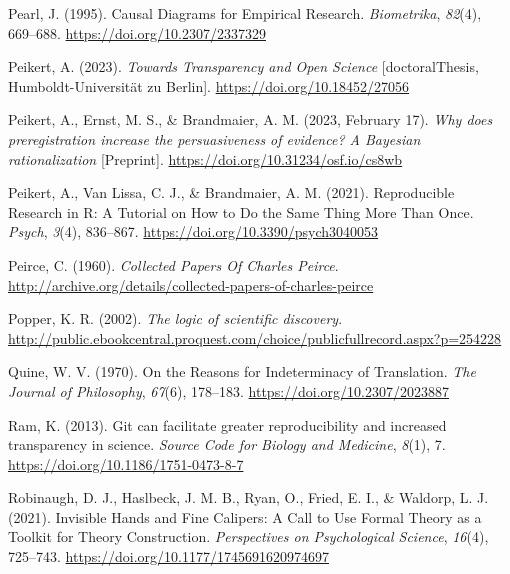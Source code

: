 \documentclass[man]{apa7}
\newlength{\cslhangindent}
\newenvironment{CSLReferences}[2] %
 {\begin{list}{}{%
  \setlength{\itemindent}{0pt}
  \setlength{\leftmargin}{0pt}
  \setlength{\parsep}{0pt}
  \ifodd #1
   \setlength{\leftmargin}{\cslhangindent}
   \setlength{\itemindent}{-1\cslhangindent}
  \fi
  \setlength{\itemsep}{#2\baselineskip}}}
 {\end{list}}
\begin{document}
\begin{CSLReferences}{1}{0}
Pearl, J. (1995). Causal {Diagrams} for {Empirical Research}. \emph{Biometrika}, \emph{82}(4), 669--688. \url{https://doi.org/10.2307/2337329}

Peikert, A. (2023). \emph{Towards {Transparency} and {Open Science}} {[}doctoralThesis, Humboldt-Universität zu Berlin{]}. \url{https://doi.org/10.18452/27056}

Peikert, A., Ernst, M. S., \& Brandmaier, A. M. (2023, February 17). \emph{Why does preregistration increase the persuasiveness of evidence? {A Bayesian} rationalization} {[}Preprint{]}. \url{https://doi.org/10.31234/osf.io/cs8wb}

Peikert, A., Van Lissa, C. J., \& Brandmaier, A. M. (2021). Reproducible {Research} in {R}: {A Tutorial} on {How} to {Do} the {Same Thing More Than Once}. \emph{Psych}, \emph{3}(4), 836--867. \url{https://doi.org/10.3390/psych3040053}

Peirce, C. (1960). \emph{Collected {Papers Of Charles Peirce}}. \url{http://archive.org/details/collected-papers-of-charles-peirce}

Popper, K. R. (2002). \emph{The logic of scientific discovery}. \url{http://public.ebookcentral.proquest.com/choice/publicfullrecord.aspx?p=254228}

Quine, W. V. (1970). On the {Reasons} for {Indeterminacy} of {Translation}. \emph{The Journal of Philosophy}, \emph{67}(6), 178--183. \url{https://doi.org/10.2307/2023887}

Ram, K. (2013). Git can facilitate greater reproducibility and increased transparency in science. \emph{Source Code for Biology and Medicine}, \emph{8}(1), 7. \url{https://doi.org/10.1186/1751-0473-8-7}

Robinaugh, D. J., Haslbeck, J. M. B., Ryan, O., Fried, E. I., \& Waldorp, L. J. (2021). Invisible {Hands} and {Fine Calipers}: {A Call} to {Use Formal Theory} as a {Toolkit} for {Theory Construction}. \emph{Perspectives on Psychological Science}, \emph{16}(4), 725--743. \url{https://doi.org/10.1177/1745691620974697}


\end{CSLReferences}
\end{document}
